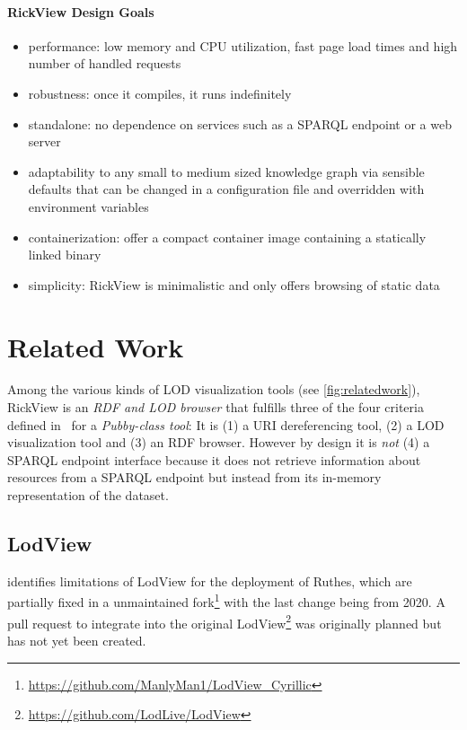 \documentclass{ceurart}
\begin{document}
\paragraph{RickView Design Goals}
\begin{itemize}
\item
  performance: low memory and CPU utilization, fast page load times and high number of handled requests
\item
  robustness: once it compiles, it runs indefinitely
\item
  standalone: no dependence on services such as a SPARQL endpoint or a web server
\item
  adaptability to any small to medium sized knowledge graph via sensible defaults that can be changed in a configuration file and overridden with environment variables
\item
  containerization: offer a compact container image containing a statically linked binary
\item
  simplicity: RickView is minimalistic and only offers browsing of static data
\end{itemize}

\section{Related Work}\label{relatedwork}


Among the various kinds of LOD visualization tools (see \cref{fig:relatedwork}), RickView is an \emph{RDF and LOD browser} that fulfills three of the four criteria defined in~\cite{adaptinglodview} for a \emph{Pubby-class tool}:
It is (1) a URI dereferencing tool, (2) a LOD visualization tool and (3) an RDF browser.
However by design it is \emph{not} (4) a SPARQL endpoint interface because it does not retrieve information about resources from a SPARQL endpoint but instead from its in-memory representation of the dataset.

\subsection{LodView}

\citep{adaptinglodview} identifies limitations of LodView for the deployment of Ruthes, which are partially fixed in a unmaintained fork\footnote{\url{https://github.com/ManlyMan1/LodView\_Cyrillic}} with the last change being from 2020.
A pull request to integrate into the original LodView\footnote{\url{https://github.com/LodLive/LodView}} was originally planned but has not yet been created.
\end{document}
